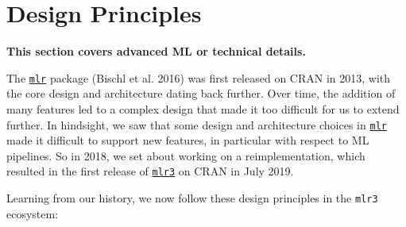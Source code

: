 \hypertarget{design-principles}{%
\section{Design Principles}\label{design-principles}}

\begin{tcolorbox}[enhanced jigsaw, colframe=quarto-callout-note-color-frame, rightrule=.15mm, bottomrule=.15mm, toprule=.15mm, opacityback=0, colback=white, left=2mm, arc=.35mm, breakable, leftrule=.75mm]
\begin{minipage}[t]{5.5mm}
\textcolor{quarto-callout-note-color}{\faInfo}
\end{minipage}%
\begin{minipage}[t]{\textwidth - 5.5mm}

\textbf{This section covers advanced ML or technical
details.}\vspace{2mm}

\end{minipage}%
\end{tcolorbox}

The
\href{https://cran.r-project.org/package=mlr}{\texttt{mlr}}
package (Bischl et al. 2016) was first released on CRAN in 2013, with
the core design and architecture dating back further. Over time, the
addition of many features led to a complex design that made it too
difficult for us to extend further. In hindsight, we saw that some
design and architecture choices in
\href{https://cran.r-project.org/package=mlr}{\texttt{mlr}} made it
difficult to support new features, in particular with respect to ML
pipelines. So in 2018, we set about working on a reimplementation, which
resulted in the first release of
\href{https://mlr3.mlr-org.com}{\texttt{mlr3}} on
CRAN in July 2019.

Learning from our history, we now follow these design principles in the
\texttt{mlr3} ecosystem:

